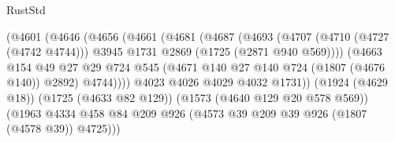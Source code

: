 \begin{lexlean}{RustStd}
\begin{coremodule}
{\begin{coremodule}
{{{{{{{{{{{{{                                          (@4601
                                            (@4646
                                              (@4656
                                                (@4661
                                                  (@4681
                                                    (@4687
                                                      (@4693
                                                        (@4707
                                                          (@4710 (@4727 (@4742 @4744)))
                                                          @3945
                                                          @1731
                                                          @2869
                                                          (@1725 (@2871 @940 @569))))
                                                      (@4663
                                                        @154
                                                        @49
                                                        @27
                                                        @29
                                                        @724
                                                        @545
                                                        (@4671
                                                          @140
                                                          @27
                                                          @140
                                                          @724
                                                          (@1807 (@4676 @140))
                                                          @2892)
                                                        @4744))))
                                                @4023
                                                @4026
                                                @4029
                                                @4032
                                                @1731))
                                            (@1924 (@4629 @18))
                                            (@1725 (@4633 @82 @129))
                                            (@1573 (@4640 @129 @20 @578 @569))
                                            (@1963
                                              @4334
                                              @458
                                              @84
                                              @209
                                              @926
                                              (@4573 @39 @209 @39 @926 (@1807 (@4578 @39)) @4725)))
}}}}}}}}}}}}}
\end{coremodule}}
\end{coremodule}
\end{lexlean}
